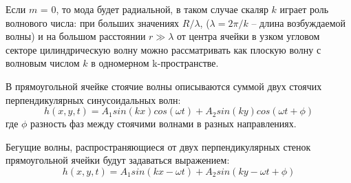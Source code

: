 Если $m$ = 0, то мода будет радиальной, в таком случае скаляр $k$ играет роль волнового числа: при больших значениях $R/\lambda$, ($\lambda = 2\pi/k$ – длина возбуждаемой волны) и на большом расстоянии $r \gg \lambda$ от центра ячейки в узком угловом секторе цилиндрическую волну можно рассматривать как плоскую волну с волновым числом $k$ в одномерном k-пространстве.

В прямоугольной ячейке стоячие волны описываются суммой двух стоячих перпендикулярных синусоидальных волн:
\begin{equation}
\label{eq:waveStand}
h(x, y, t) = A_1 sin(kx)cos(\omega t)+A_2 sin(ky)cos(\omega t+ \phi)
\end{equation}
где $\phi$ разность фаз между стоячими волнами в разных направлениях.

Бегущие волны, распространяющиеся от двух перпендикулярных стенок прямоугольной ячейки будут задаваться выражением:
\begin{equation}
\label{eq:waveRun}
h(x, y, t) = A_1 sin(kx-\omega t)+A_2 sin(ky-\omega t+ \phi)
\end{equation}



